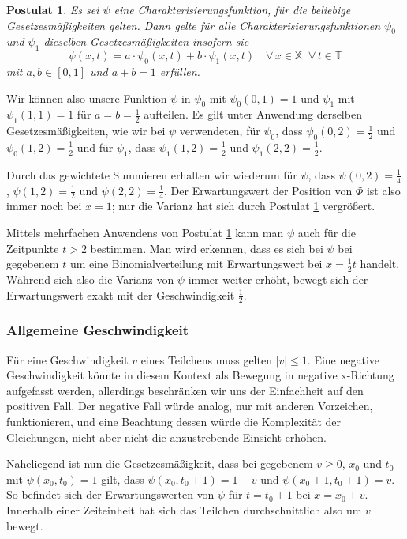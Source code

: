 \documentclass[a4paper,12pt,ngerman]{scrartcl}
\theoremstyle{plain}
\theoremstyle{plain}
\theoremstyle{plain}
\newtheorem{postulate}{Postulat}
\theoremstyle{plain}
\newcommand{\T}{\mathbb{T}}
\newcommand{\X}{\mathbb{X}}
\begin{document}
\begin{postulate}\label{pos_einstein}
Es sei $\psi$ eine Charakterisierungsfunktion, für die beliebige Gesetzesmäßigkeiten gelten. Dann gelte für alle Charakterisierungsfunktionen $\psi_0$ und $\psi_1$ dieselben Gesetzesmäßigkeiten insofern sie
\[\psi(x,t)=a\cdot\psi_0(x,t)+b\cdot\psi_1(x,t)\quad\forall\,x\in\X\;\;\forall\,t \in\T\]
mit $a,b\in[0,1]$ und $a+b=1$ erfüllen.
\end{postulate}

Wir können also unsere Funktion $\psi$ in $\psi_0$ mit $\psi_0(0,1)=1$ und $\psi_1$ mit $\psi_1(1,1)=1$ für $a=b=\frac{1}{2}$ aufteilen. Es gilt unter Anwendung derselben Gesetzesmäßigkeiten, wie wir bei $\psi$ verwendeten, für $\psi_0$, dass $\psi_0(0,2)=\frac{1}{2}$ und $\psi_0(1,2)=\frac{1}{2}$ und für $\psi_1$, dass $\psi_1(1,2)=\frac{1}{2}$ und $\psi_1(2,2)=\frac{1}{2}$. 

Durch das gewichtete Summieren erhalten wir wiederum für $\psi$, dass $\psi(0,2)=\frac{1}{4}$, $\psi(1,2)=\frac{1}{2}$ und $\psi(2,2)=\frac{1}{4}$. Der Erwartungswert der Position von $\Phi$ ist also immer noch bei $x=1$; nur die Varianz hat sich durch Postulat \ref{pos_einstein} vergrößert.

Mittels mehrfachen Anwendens von Postulat \ref{pos_einstein} kann man $\psi$ auch für die Zeitpunkte $t>2$ bestimmen. Man wird erkennen, dass es sich bei $\psi$ bei gegebenem $t$ um eine Binomialverteilung mit Erwartungswert bei $x=\frac{1}{2}t$ handelt. Während sich also die Varianz von $\psi$ immer weiter erhöht, bewegt sich der Erwartungswert exakt mit der Geschwindigkeit $\frac{1}{2}$.

\subsubsection{Allgemeine Geschwindigkeit}

Für eine Geschwindigkeit $v$ eines Teilchens muss gelten $|v|\leq 1$. Eine negative Geschwindigkeit könnte in diesem Kontext als Bewegung in negative x-Richtung aufgefasst werden, allerdings beschränken wir uns der Einfachheit auf den positiven Fall. Der negative Fall würde analog, nur mit anderen Vorzeichen, funktionieren, und eine Beachtung dessen würde die Komplexität der Gleichungen, nicht aber nicht die anzustrebende Einsicht erhöhen.

Naheliegend ist nun die Gesetzesmäßigkeit, dass bei gegebenem $v\geq0$, $x_0$ und $t_0$ mit $\psi(x_0,t_0)=1$ gilt, dass $\psi(x_0,t_0+1)=1-v$ und $\psi(x_0+1,t_0+1)=v$. So befindet sich der Erwartungswerten von $\psi$ für $t=t_0+1$ bei $x=x_0+v$. Innerhalb einer Zeiteinheit hat sich das Teilchen durchschnittlich also um $v$ bewegt. 
\end{document}

